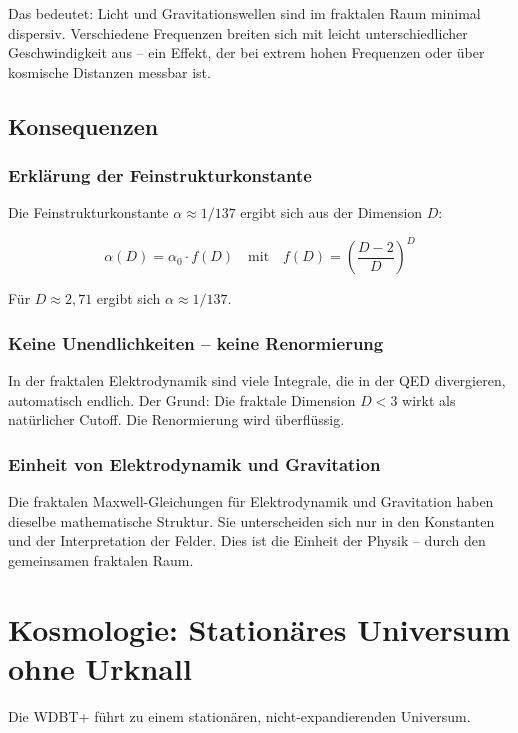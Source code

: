 \documentclass[12pt,a4paper]{article}
\begin{document}
Das bedeutet: Licht und Gravitationswellen sind im fraktalen Raum minimal dispersiv. Verschiedene Frequenzen breiten sich mit leicht unterschiedlicher Geschwindigkeit aus -- ein Effekt, der bei extrem hohen Frequenzen oder über kosmische Distanzen messbar ist.

\subsection{Konsequenzen}

\subsubsection{Erklärung der Feinstrukturkonstante}
Die Feinstrukturkonstante $\alpha \approx 1/137$ ergibt sich aus der Dimension $D$:

\begin{equation}
\alpha(D) = \alpha_0 \cdot f(D) \quad \text{mit} \quad f(D) = \left( \frac{D-2}{D} \right)^D
\end{equation}

Für $D \approx 2,71$ ergibt sich $\alpha \approx 1/137$.

\subsubsection{Keine Unendlichkeiten -- keine Renormierung}
In der fraktalen Elektrodynamik sind viele Integrale, die in der QED divergieren, automatisch endlich. Der Grund: Die fraktale Dimension $D < 3$ wirkt als natürlicher Cutoff. Die Renormierung wird überflüssig.

\subsubsection{Einheit von Elektrodynamik und Gravitation}
Die fraktalen Maxwell-Gleichungen für Elektrodynamik und Gravitation haben dieselbe mathematische Struktur. Sie unterscheiden sich nur in den Konstanten und der Interpretation der Felder. Dies ist die Einheit der Physik -- durch den gemeinsamen fraktalen Raum.

\section{Kosmologie: Stationäres Universum ohne Urknall}

Die WDBT+ führt zu einem stationären, nicht-expandierenden Universum.
\end{document}
